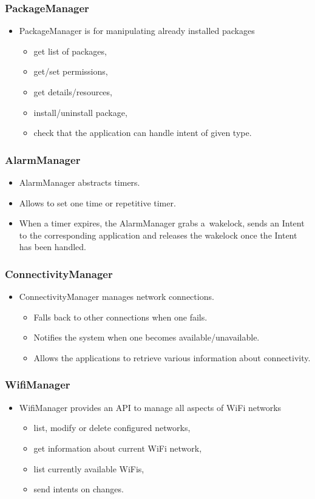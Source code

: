 \documentclass[10pt,xcolor=pdflatex]{beamer}
\begin{document}
\begin{frame}[fragile]\frametitle{PackageManager}
\begin{itemize}
	\item PackageManager is for manipulating already installed packages
	  \begin{itemize}
		\item get list of packages,
		\item get/set permissions,
		\item get details/resources,
		\item install/uninstall package,
		\item check that the application can handle intent of given type.
	  \end{itemize}
\end{itemize}
\end{frame}


\begin{frame}[fragile]\frametitle{AlarmManager}
\begin{itemize}
	\item AlarmManager abstracts timers.
	\item Allows to set one time or repetitive timer.
	\item When a timer expires, the AlarmManager grabs a~wakelock, sends an Intent to the corresponding application and releases the wakelock once the Intent has been handled.
\end{itemize}
\end{frame}


\begin{frame}[fragile]\frametitle{ConnectivityManager}
\begin{itemize}
	\item ConnectivityManager manages network connections.
	  \begin{itemize}
		\item Falls back to other connections when one fails.
		\item Notifies the system when one becomes available/unavailable.
		\item Allows the applications to retrieve various information about connectivity.
	  \end{itemize}
\end{itemize}
\end{frame}


\begin{frame}[fragile]\frametitle{WifiManager}
\begin{itemize}
	\item WifiManager provides an API to manage all aspects of WiFi networks
      \begin{itemize}
    	\item list, modify or delete configured networks,
		\item get information about current WiFi network,
		\item list currently available WiFis,
		\item send intents on changes.
      \end{itemize}
\end{itemize}
\end{frame}
\end{document}
